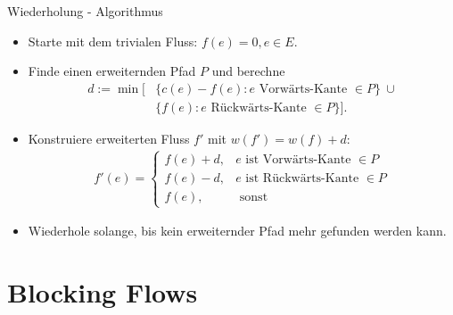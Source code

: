 \documentclass[aspectratio=169]{beamer}
\begin{document}
\begin{frame}{Wiederholung - Algorithmus}

  \begin{algorithmus*}
    \begin{itemize}
      \item Starte mit dem trivialen Fluss: $f(e) = 0 , e \in E$.
      \item Finde einen erweiternden Pfad $P$ und berechne
      \begin{align*}
        d := \min[&\{c(e) - f(e): e \text{ Vorwärts-Kante } \in P\} \ \cup \\
        &\{f(e): e \text{ Rückwärts-Kante } \in P\} ].
      \end{align*}
      \item Konstruiere erweiterten Fluss $f'$ mit $w(f') = w(f) + d$:
      \begin{align*}
        f'(e) = \begin{cases}
          f(e) + d, & e \text{ ist Vorwärts-Kante } \in P \\
          f(e) - d, & e \text{ ist Rückwärts-Kante } \in P\\
          f(e), & \text{ sonst}
        \end{cases}
      \end{align*}
      \item Wiederhole solange, bis kein erweiternder Pfad mehr gefunden werden kann.
    \end{itemize}
  \end{algorithmus*}

\end{frame}

\section{Blocking Flows}
\end{document}
